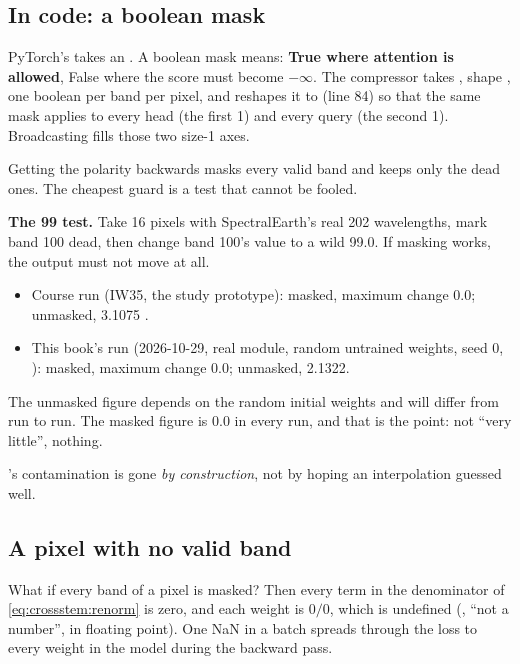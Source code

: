\subsection{In code: a boolean mask}

PyTorch's  takes an . A boolean mask means: \textbf{True where attention is allowed}, False where the score must become $-\infty$. The compressor takes , shape , one boolean per band per pixel, and reshapes it to  (line 84) so that the same mask applies to every head (the first 1) and every query (the second 1). Broadcasting fills those two size-1 axes.

Getting the polarity backwards masks every valid band and keeps only the dead ones. The cheapest guard is a test that cannot be fooled.

\begin{drift}
\textbf{The 99 test.} Take 16 pixels with SpectralEarth's real 202 wavelengths, mark band 100 dead, then change band 100's value to a wild 99.0. If masking works, the output must not move at all.
\begin{itemize}
\item Course run (IW35, the study prototype): masked, maximum change 0.0; unmasked, 3.1075 .
\item This book's run (2026-10-29, real module, random untrained weights, seed 0, ): masked, maximum change 0.0\tagC; unmasked, 2.1322\tagC.
\end{itemize}
The unmasked figure depends on the random initial weights and will differ from run to run. The masked figure is 0.0 in every run, and that is the point: not ``very little'', nothing.
\end{drift}

's contamination is gone \emph{by construction}, not by hoping an interpolation guessed well.

\subsection{A pixel with no valid band}\label{sec:crossstem:empty}

What if every band of a pixel is masked? Then every term in the denominator of \cref{eq:crossstem:renorm} is zero, and each weight is $0/0$, which is undefined (, ``not a number'', in floating point). One NaN in a batch spreads through the loss to every weight in the model during the backward pass.

